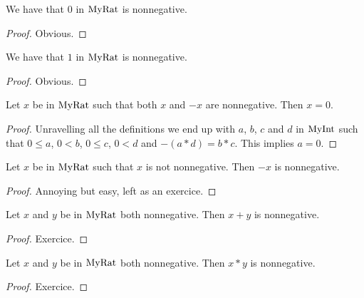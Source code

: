 \begin{lemma}
    \label{MyRat.zero_nonneg}
    \leanok
    We have that $0$ in $\mathrm{MyRat}$ is nonnegative.
\end{lemma}
\begin{proof}
    \leanok
    Obvious.
\end{proof}

\begin{lemma}
    \label{MyRat.one_nonneg}
    \leanok
    We have that $1$ in $\mathrm{MyRat}$ is nonnegative.
\end{lemma}
\begin{proof}
    \leanok
    Obvious.
\end{proof}

\begin{lemma}
    \label{MyRat.nonneg_neg}
    \leanok
    Let $x$ be in $\mathrm{MyRat}$ such that both $x$ and $-x$ are nonnegative. Then $x = 0$.
\end{lemma}
\begin{proof}
    \leanok
    Unravelling all the definitions we end up with $a$, $b$, $c$ and $d$ in $\mathrm{MyInt}$ such that $0 \leq a$, $0 < b$, $0 \leq c$, $0 < d$ and $-(a*d)=b*c$. This implies $a=0$.
\end{proof}

\begin{lemma}
    \label{MyRat.nonneg_neg_of_not_nonneg}
    \leanok
    Let $x$ be in $\mathrm{MyRat}$ such that $x$ is not nonnegative. Then $-x$ is nonnegative.
\end{lemma}
\begin{proof}
    \leanok
    Annoying but easy, left as an exercice.
\end{proof}

\begin{lemma}
    \label{MyRat.isNonneg_add_isNonneg}
    \leanok
    Let $x$ and $y$ be in $\mathrm{MyRat}$ both nonnegative. Then $x+y$ is nonnegative.
\end{lemma}
\begin{proof}
    \leanok
    Exercice.
\end{proof}

\begin{lemma}
    \label{MyRat.isNonneg_mul_isNonneg}
    \leanok
    Let $x$ and $y$ be in $\mathrm{MyRat}$ both nonnegative. Then $x*y$ is nonnegative.
\end{lemma}
\begin{proof}
    \leanok
    Exercice.
\end{proof}


